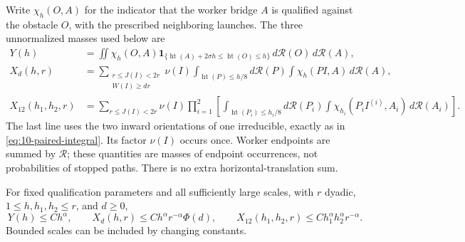 Write $\chi_h(O,A)$ for the indicator that the worker bridge $A$
is qualified against the obstacle $O$, with the prescribed neighboring
launches. The three unnormalized masses used below are
\begin{align*}
 Y(h)&=\iint \chi_h(O,A)
 \mathbf1_{\{\operatorname{ht}(A)+2\sigma h\le
                    \operatorname{ht}(O)\le h\}}
 \,d\mathcal R(O)\,d\mathcal R(A),\\
 X_d(h,r)&=\sum_{\substack{r\le J(I)<2r\\W(I)\ge dr}}\nu(I)
 \int_{\operatorname{ht}(P)\le h/8}d\mathcal R(P)
 \int\chi_h(PI,A)\,d\mathcal R(A),\\
 X_{12}(h_1,h_2,r)&=
 \sum_{r\le J(I)<2r}\nu(I)
 \prod_{i=1}^2\left[
 \int_{\operatorname{ht}(P_i)\le h_i/8}d\mathcal R(P_i)
 \int\chi_{h_i}(P_i I^{(i)},A_i)\,d\mathcal R(A_i)
 \right].
\end{align*}
The last line uses the two inward orientations of one irreducible,
exactly as in \eqref{eq:10-paired-integral}. Its factor $\nu(I)$
occurs once. Worker endpoints are summed by $\mathcal R$; these
quantities are masses of endpoint occurrences, not probabilities of
stopped paths. There is no extra horizontal-translation sum.

\begin{lemma}
\label{lem:10-hairpins}
For fixed qualification parameters and all sufficiently large scales,
with \(r\) dyadic, \(1\le h,h_1,h_2\le r\), and \(d\ge0\),
\[
 Y(h)\le Ch^\alpha,\qquad
 X_d(h,r)\le Ch^\alpha r^{-\alpha}\Phi(d),\qquad
 X_{12}(h_1,h_2,r)\le Ch_1^\alpha h_2^\alpha r^{-\alpha}.
\]
Bounded scales can be included by changing constants.
\end{lemma}

